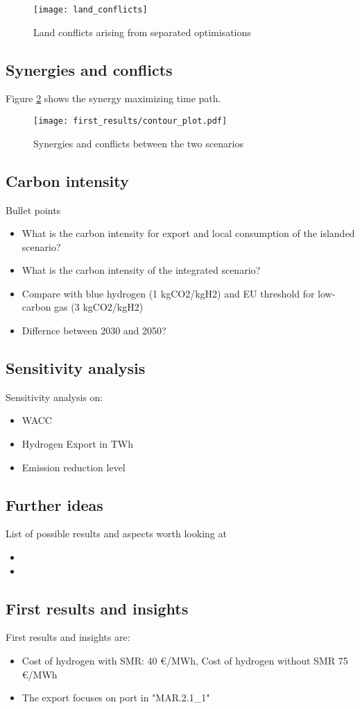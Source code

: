 \begin{figure}[h!]
    \centering
    \texttt{[image: land\_conflicts]}
    \caption{Land conflicts arising from separated optimisations}
    \label{fig:land_conflicts}
\end{figure}




\subsection{Synergies and conflicts}
Figure \ref{fig:contour_plot} shows the synergy maximizing time path.

\begin{figure}[h!]
    \centering
    \texttt{[image: first\_results/contour\_plot.pdf]}
    \caption{Synergies and conflicts between the two scenarios}
    \label{fig:contour_plot}
\end{figure}

\subsection{Carbon intensity}
Bullet points
\begin{itemize}
    \item What is the carbon intensity for export and local consumption of the islanded scenario? 
    \item What is the carbon intensity of the integrated scenario?
    \item Compare with blue hydrogen (1 kgCO2/kgH2) and EU threshold for low-carbon gas (3 kgCO2/kgH2)
    \item Differnce between 2030 and 2050?
\end{itemize}



\subsection{Sensitivity analysis}
Sensitivity analysis on:
\begin{itemize}
    \item WACC
    \item Hydrogen Export in TWh
    \item Emission reduction level
\end{itemize}


\subsection{Further ideas}
List of possible results and aspects worth looking at
\begin{itemize}
    \item 
    \item 
\end{itemize}


\subsection{First results and insights}

First results and insights are:
\begin{itemize}
    \item Cost of hydrogen with SMR: 40 €/MWh, Cost of hydrogen without SMR 75 €/MWh
    \item The export focuses on port in "MAR.2.1{\_}1"
\end{itemize}


